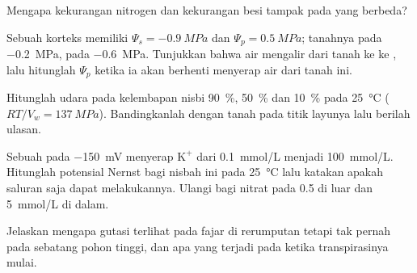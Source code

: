 \begin{exercise}[$\star$]\label{exo:b1:plant-water-minerals:4}
Mengapa kekurangan nitrogen dan kekurangan besi tampak pada  yang
berbeda?
\end{exercise}

\begin{exercise}[$\star\star$]\label{exo:b1:plant-water-minerals:5}
Sebuah  korteks  memiliki $\Psi_s = \qty{-0.9}{MPa}$ dan $\Psi_p =
\qty{0.5}{MPa}$; tanahnya pada \qty{-0.2}{MPa},  pada
\qty{-0.6}{MPa}. Tunjukkan bahwa air mengalir dari tanah ke  ke
, lalu hitunglah $\Psi_p$  ketika ia akan berhenti menyerap
air dari tanah ini.
\end{exercise}

\begin{exercise}[$\star\star$]\label{exo:b1:plant-water-minerals:6}
Hitunglah  udara pada kelembapan nisbi \qty{90}{\%},
\qty{50}{\%} dan \qty{10}{\%} pada \qty{25}{\celsius} ($RT/V_w =
\qty{137}{MPa}$). Bandingkanlah dengan tanah pada titik layunya lalu
berilah ulasan.
\end{exercise}

\begin{exercise}[$\star\star$]\label{exo:b1:plant-water-minerals:7}
Sebuah   pada \qty{-150}{mV} menyerap $\mathrm{K^+}$ dari
\qty{0.1}{mmol/L} menjadi \qty{100}{mmol/L}. Hitunglah potensial
Nernst bagi nisbah ini pada \qty{25}{\celsius} lalu katakan apakah
saluran saja dapat melakukannya. Ulangi bagi nitrat pada \qty{0.5}{}
di luar dan \qty{5}{mmol/L} di dalam.
\end{exercise}

\begin{exercise}[$\star\star$]\label{exo:b1:plant-water-minerals:8}
Jelaskan mengapa gutasi terlihat pada fajar di rerumputan tetapi tak
pernah pada sebatang pohon tinggi, dan apa yang terjadi pada  ketika transpirasinya mulai.
\end{exercise}

